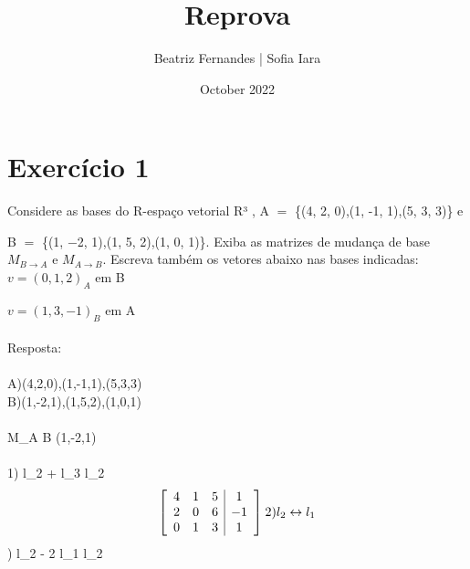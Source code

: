 \documentclass[12pt,a4]{article}
\title{Reprova}
\author{Beatriz Fernandes | Sofia Iara }
\date{October 2022}
\begin{document}
\maketitle

\section*{Exercício 1}
 Considere as bases do R-espaço vetorial R³
, A $=$ \{(4, 2, 0),(1, -1, 1),(5, 3, 3)\} e

B $=$ \{(1, −2, 1),(1, 5, 2),(1, 0, 1)\}. Exiba as matrizes de mudança de base $M_{B \rightarrow A}$ e $ M_{A \rightarrow B}$. Escreva também os
vetores abaixo nas bases indicadas:\\
 

\bullet $v = (0, 1, 2)_{A}$ em B

\bullet $v = (1, 3, −1)_{B}$ em A\\ \\
Resposta:\\ \\
A){(4,2,0),(1,-1,1),(5,3,3)}\\
B){(1,-2,1),(1,5,2),(1,0,1)}\\ \\
\bullet M_{A \rightarrow B} (1,-2,1)\\ \\
 \hspace{0.02cm}1) l_{2} + l_{3} \rightarrow l_{2}
\left
\begin{equation*}
\left[\begin{array}{ccc|c}
4 & 1 & 5 & 1 \\
2 & 0 & 6 & -1\\
0 & 1 & 3 & 1\\
\end{array}\right] \hspace{0.02cm}2) l_{2}\leftrightarrow l_{1}
\end{equation*}
) l_{2} - 2 \cdot l_{1} \rightarrow l_{2}\newline\\  \\
\end{document}
